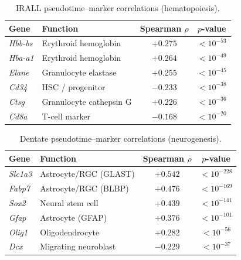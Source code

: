 \documentclass[journal]{IEEEtran}
\begin{document}
\begin{table}[!t]
    \centering
    \caption{IRALL pseudotime--marker correlations (hematopoiesis).}
    \label{tab:irall_markers}
    \begin{tabular}{llcc}
        \toprule
        Gene & Function & Spearman $\rho$ & $p$-value \\
        \midrule
        \textit{Hbb-bs} & Erythroid hemoglobin     & $+0.275$ & $< 10^{-53}$ \\
        \textit{Hba-a1} & Erythroid hemoglobin     & $+0.264$ & $< 10^{-49}$ \\
        \textit{Elane}  & Granulocyte elastase     & $+0.255$ & $< 10^{-45}$ \\
        \textit{Cd34}   & HSC / progenitor         & $-0.233$ & $< 10^{-38}$ \\
        \textit{Ctsg}   & Granulocyte cathepsin G  & $+0.226$ & $< 10^{-36}$ \\
        \textit{Cd8a}   & T-cell marker            & $-0.168$ & $< 10^{-20}$ \\
        \bottomrule
    \end{tabular}
\end{table}

\begin{table}[!t]
    \centering
    \caption{Dentate pseudotime--marker correlations (neurogenesis).}
    \label{tab:dentate_markers}
    \begin{tabular}{llcc}
        \toprule
        Gene & Function & Spearman $\rho$ & $p$-value \\
        \midrule
        \textit{Slc1a3} & Astrocyte/RGC (GLAST)  & $+0.542$ & $< 10^{-228}$ \\
        \textit{Fabp7}  & Astrocyte/RGC (BLBP)   & $+0.476$ & $< 10^{-169}$ \\
        \textit{Sox2}   & Neural stem cell        & $+0.439$ & $< 10^{-141}$ \\
        \textit{Gfap}   & Astrocyte (GFAP)        & $+0.376$ & $< 10^{-101}$ \\
        \textit{Olig1}  & Oligodendrocyte         & $+0.282$ & $< 10^{-56}$  \\
        \textit{Dcx}    & Migrating neuroblast    & $-0.229$ & $< 10^{-37}$  \\
        \bottomrule
    \end{tabular}
\end{table}
\end{document}
